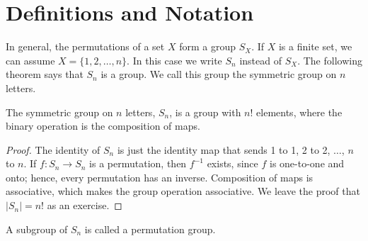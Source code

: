  
\section{Definitions and Notation}
 
 
In general, the permutations of a set $X$ form a group $S_X$. If $X$
is a finite set, we can assume $X=\{ 1, 2, \ldots, n\}$. In this case
we write $S_n$\label{symmetricgroup} instead of $S_X$. The following
theorem says that $S_n$ is a group. We call this group the {\bfi
symmetric group on $n$ letters}. 
 
 
\begin{theorem}
The symmetric group on $n$ letters, $S_n$, is a group with $n!$
elements, where the binary operation is the composition of maps.
\end{theorem}
 
 
\begin{proof}
The identity of $S_n$ is just the identity map that sends 1 to 1, 2 to
2, $\ldots$, $n$ to $n$. If $f : S_n \rightarrow S_n$ is a
permutation, then $f^{-1}$ exists, since $f$ is one-to-one and onto;
hence, every permutation has an inverse. Composition of maps is
associative, which makes the group operation associative. We leave the
proof that $|S_n|= n!$ as an exercise.
\end{proof}
 
 
\vspace{2ex}
 
 
A subgroup of $S_n$ is called a {\bfi permutation
group}.
 
 
\vspace{2ex}
 
